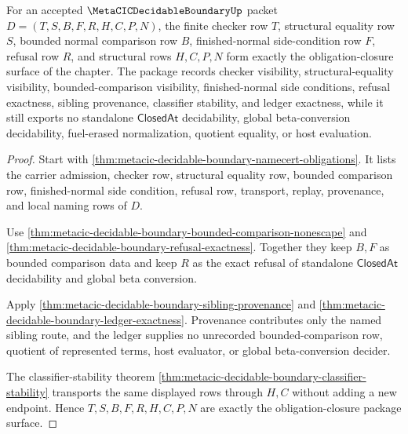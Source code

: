 \begin{theorem}
\label{thm:metacic-decidable-boundary-obligation-closure-package}
For an accepted $\MetaCICDecidableBoundaryUp$ packet $D=(T,S,B,F,R,H,C,P,N)$, the finite checker row $T$, structural equality row $S$, bounded normal comparison row $B$, finished-normal side-condition row $F$, refusal row $R$, and structural rows $H,C,P,N$ form exactly the obligation-closure surface of the chapter. The package records checker visibility, structural-equality visibility, bounded-comparison visibility, finished-normal side conditions, refusal exactness, sibling provenance, classifier stability, and ledger exactness, while it still exports no standalone $\mathsf{ClosedAt}$ decidability, global beta-conversion decidability, fuel-erased normalization, quotient equality, or host evaluation.
\end{theorem}
\begin{proof}
Start with \autoref{thm:metacic-decidable-boundary-namecert-obligations}. It lists the carrier admission, checker row, structural equality row, bounded comparison row, finished-normal side condition, refusal row, transport, replay, provenance, and local naming rows of $D$.

Use \autoref{thm:metacic-decidable-boundary-bounded-comparison-nonescape} and \autoref{thm:metacic-decidable-boundary-refusal-exactness}. Together they keep $B,F$ as bounded comparison data and keep $R$ as the exact refusal of standalone $\mathsf{ClosedAt}$ decidability and global beta conversion.

Apply \autoref{thm:metacic-decidable-boundary-sibling-provenance} and \autoref{thm:metacic-decidable-boundary-ledger-exactness}. Provenance contributes only the named sibling route, and the ledger supplies no unrecorded bounded-comparison row, quotient of represented terms, host evaluator, or global beta-conversion decider.

The classifier-stability theorem \autoref{thm:metacic-decidable-boundary-classifier-stability} transports the same displayed rows through $H,C$ without adding a new endpoint. Hence $T,S,B,F,R,H,C,P,N$ are exactly the obligation-closure package surface.
\end{proof}

